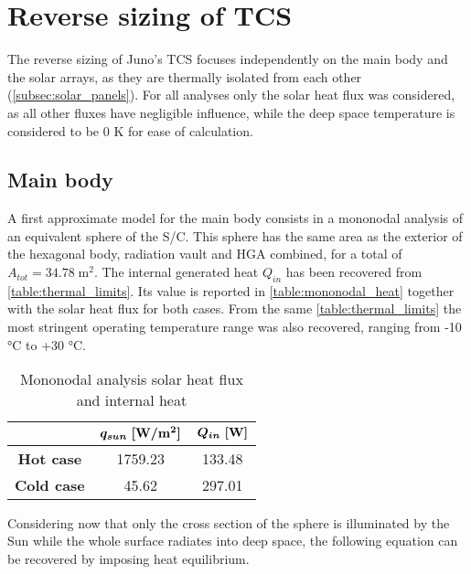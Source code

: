 \section{Reverse sizing of TCS}
\label{sec:TCS_sizing}

The reverse sizing of Juno's TCS focuses independently on the main body and the solar arrays, as they are thermally isolated from each other (\autoref{subsec:solar_panels}). For all analyses only the solar heat flux was considered, as all other fluxes have negligible influence, while the deep space temperature is considered to be 0 K for ease of calculation.

\subsection{Main body}
\label{subsec:mb_mono_sizing}

A first approximate model for the main body consists in a mononodal analysis of an equivalent sphere of the S/C. This sphere has the same area as the exterior of the hexagonal body, radiation vault and HGA combined, for a total of $A_{tot} = 34.78 \; \textrm{m}^2$. The internal generated heat $Q_{in}$ has been recovered from \autoref{table:thermal_limits}. Its value is reported in \autoref{table:mononodal_heat} together with the solar heat flux for both cases. From the same \autoref{table:thermal_limits} the most stringent operating temperature range was also recovered, ranging from -10 °C to +30 °C. 
\begin{table}[H]
    \renewcommand{\arraystretch}{1.3}
    \centering
    \begin{tabular}{|c|c|c|}
        \hline
        & $\boldsymbol{q_{sun} \; [\textrm{\textbf{W}}/\textrm{\textbf{m}}^2]}$ & $\boldsymbol{Q_{in} \; [\textrm{\textbf{W}}]}$ \\
        \hline
        \hline
        \textbf{Hot case} & 1759.23 & 133.48 \\
        \hline
        \textbf{Cold case} & 45.62 & 297.01 \\ 
        \hline
    \end{tabular}
    \caption{Mononodal analysis solar heat flux and internal heat}
    \label{table:mononodal_heat}
\end{table}

\vspace*{-3mm}

Considering now that only the cross section of the sphere is illuminated by the Sun while the whole surface radiates into deep space, the following equation can be recovered by imposing heat equilibrium.

